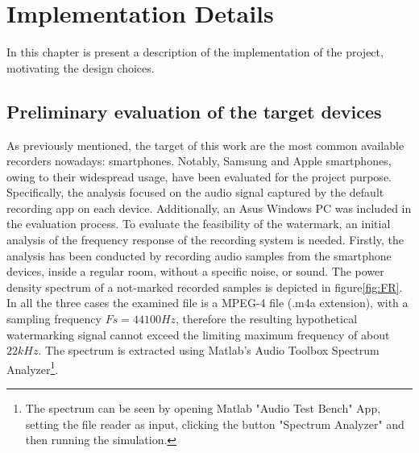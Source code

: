 
\chapter{Implementation Details}
In this chapter is present a description of the implementation of the project, motivating the design choices.
\section{Preliminary evaluation of the target devices}
As previously mentioned, the target of this work are the most common available recorders nowadays: smartphones. Notably, Samsung and Apple smartphones, owing to their widespread usage, have been evaluated for the project purpose. Specifically, the analysis
focused on the audio signal captured by the default recording app on each device. Additionally, an Asus Windows PC was included in the evaluation process. 
To evaluate the feasibility of the watermark, an initial analysis of the frequency response of the recording system is needed. Firstly, the analysis has been conducted by recording audio samples from the smartphone devices, inside a regular room, without a specific noise, or sound.  The power density spectrum of a not-marked recorded samples is depicted in figure\ref{fig:FR}. In all the three cases the examined file is a MPEG-4 file (.m4a extension), with a sampling frequency $Fs = 44100 Hz$, therefore the resulting hypothetical watermarking signal cannot exceed the limiting maximum frequency of about $22 kHz$.
The spectrum is extracted using Matlab's Audio Toolbox Spectrum Analyzer\footnote{The spectrum can be seen by opening Matlab "Audio Test Bench" App, setting the file reader as input, clicking the button "Spectrum Analyzer" and then running the simulation.}. 

